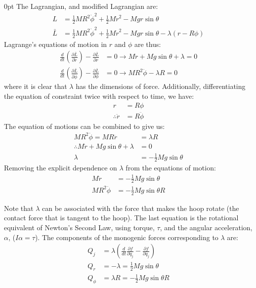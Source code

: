 \begin{example}{0pt}
The Lagrangian, and modified Lagrangian are:
\begin{align*}
L&=\frac{1}{2}MR^2\dot{\phi}^2+\frac{1}{2}M\dot{r}^2-Mgr\sin{\theta}\\
\bar{L}&=\frac{1}{2}MR^2\dot{\phi}^2+\frac{1}{2}M\dot{r}^2-Mgr\sin{\theta}-\lambda(r-R\phi)
\end{align*}
Lagrange's equations of motion in $r$ and $\phi$ are thus:
\begin{align*}
\frac{d}{dt}\left(\frac{\partial \bar{L}}{\partial \dot{r}} \right) - \frac{\partial \bar{L}}{\partial r}&=0\to
M\ddot{r}+Mg\sin{\theta}+\lambda =0\\
\frac{d}{dt}\left(\frac{\partial \bar{L}}{\partial \dot{\phi}} \right) - \frac{\partial \bar{L}}{\partial \phi}&=0\to
MR^2\ddot{\phi}-\lambda R=0
\end{align*}
where it is clear that $\lambda$ has the dimensions of force. Additionally, differentiating the equation of constraint twice with respect to time, we have:
\begin{align*}
r&=R\phi\\
\therefore \ddot{r}&=R\ddot{\phi}
\end{align*}
The equation of motions can be combined to give us:
\begin{align*}
MR^2\ddot{\phi}=MR\ddot{r}&=\lambda R\\
\therefore M\ddot{r}+Mg\sin{\theta}+\lambda &=0\\
\lambda &=-\frac{1}{2}Mg\sin{\theta}
\end{align*}
Removing the explicit dependence on $\lambda$ from the equations of motion:
\begin{align*}
 M\ddot{r}&=-\frac{1}{2}Mg\sin{\theta}\\
 MR^2\ddot{\phi}&=-\frac{1}{2}Mg\sin{\theta} R
\end{align*}

Note that $\lambda$ can be associated with the force that makes the hoop rotate (the contact force that is tangent to the hoop). The last equation is the rotational equivalent of Newton's Second Law, using torque, $\tau$, and the angular acceleration, $\alpha$, ($I\alpha=\tau$). The components of the monogenic forces corresponding to $\lambda$ are:
\begin{align*}
Q_{j}&=\lambda\left(\frac{d}{dt}\frac{\partial f}{\partial \dot{q}_j}-\frac{\partial f}{\partial q_j}\right)\\
Q_r&=-\lambda=\frac{1}{2}Mg\sin{\theta}\\
Q_\phi &=\lambda R=-\frac{1}{2}Mg\sin{\theta}R
\end{align*}
\end{example}


